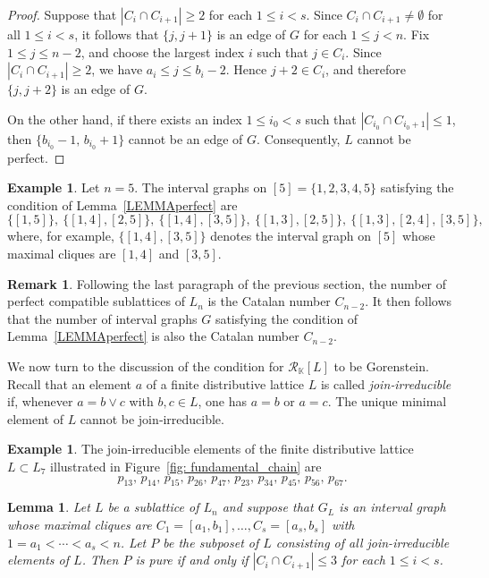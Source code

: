 \documentclass[12pt,a4paper]{amsart}
\newtheorem{Lemma}[Theorem]{Lemma}
\theoremstyle{definition}
\newtheorem{Remark}[Theorem]{Remark}
\newtheorem{Example}[Theorem]{Example}
\begin{document}
\begin{proof}
Suppose that $|C_i \cap C_{i+1}| \geq 2$ for each $1 \leq i < s$.
Since $C_i \cap C_{i+1} \neq \emptyset$ for all $1 \leq i < s$, it follows that
$\{j,j+1\}$ is an edge of $G$ for each $1 \leq j < n$.
Fix $1 \leq j \leq n-2$, and choose the largest index $i$ such that $j \in C_i$.
Since $|C_i \cap C_{i+1}| \geq 2$, we have $a_i \leq j \leq b_i - 2$.
Hence $j+2 \in C_i$, and therefore $\{j,j+2\}$ is an edge of $G$.

On the other hand, if there exists an index $1 \leq i_0 < s$ such that
$|C_{i_0} \cap C_{i_0+1}| \leq 1$, then
$\{b_{i_0}-1,\, b_{i_0}+1\}$ cannot be an edge of $G$.
Consequently, $L$ cannot be perfect.
\end{proof}

\begin{Example}
Let $n=5$.
The interval graphs on $[5] = \{ 1,2,3,4,5\}$ satisfying the condition of
Lemma~\ref{LEMMAperfect} are
$$
\{[1,5]\},\ \{[1,4],[2,5]\},\ \{[1,4],[3,5]\},\ \{[1,3],[2,5]\},\ 
\{[1,3],[2,4],[3,5]\},
$$
where, for example, $\{[1,4],[3,5]\}$ denotes the interval graph on $[5]$
whose maximal cliques are $[1,4]$ and $[3,5]$.
\end{Example}



\begin{Remark}
Following the last paragraph of the previous section, the number of perfect compatible sublattices of \(L_n\) is the Catalan number \(C_{n-2}\). It then follows that the number of interval graphs \(G\) satisfying the condition of Lemma~\ref{LEMMAperfect} is also the Catalan number \(C_{n-2}\).
\end{Remark}

We now turn to the discussion of the condition for \(\mathcal{R}_{\mathbb{K}}[L]\) to be Gorenstein. Recall that an element \(a\) of a finite distributive lattice \(L\) is called \emph{join‑irreducible} if, whenever \(a = b \vee c\) with \(b, c \in L\), one has \(a = b\) or \(a = c\). The unique minimal element of \(L\) cannot be join‑irreducible.
\begin{Example}
 The join-irreducible elements of the finite distributive lattice~${L \subset L_7}$ illustrated in
Figure~\ref{fig: fundamental_chain} are
$$
p_{13},\, p_{14},\, p_{15},\, p_{26},\, p_{47},\, p_{23},\, p_{34},\, p_{45},\, p_{56},\, p_{67}.
$$  
\end{Example}

\begin{Lemma}
    \label{Gor}
    Let $L$ be a sublattice of $L_n$ and suppose that $G_L$ is an interval graph whose maximal cliques are $C_1 =[a_1, b_1], \ldots, C_s=[a_s, b_s]$ with $1=a_1 < \cdots < a_s < n$.  
Let $P$ be the subposet of $L$ consisting of all join-irreducible elements of $L$.  Then $P$ is pure if and only if $|C_i \cap C_{i+1}| \leq 3$ for each $1 \leq i < s$.  
\end{Lemma}
\end{document}

